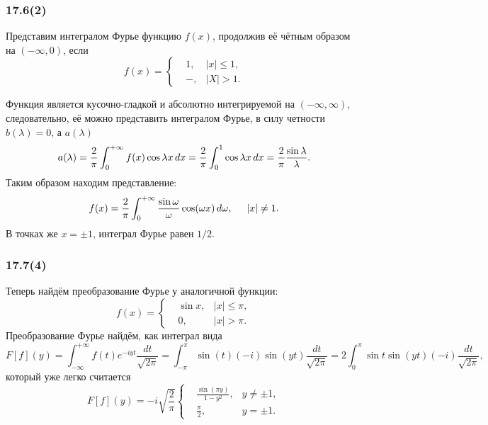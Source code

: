  \subsubsection*{17.6(2)}

 Представим интегралом Фурье функцию $f(x)$, продолжив её чётным образом на $(-\infty, 0)$, если 
 \begin{equation*}
     f(x) = \left\{\begin{aligned}
         &1, & |x|\leq 1, \\
         &-, &|X| > 1.
     \end{aligned}\right.
 \end{equation*}

 Функция является кусочно-гладкой и абсолютно интегрируемой на $(-\infty, \infty)$, следовательно, её можно представить интегралом Фурье, в силу четности $b(\lambda) = 0$, а $a(\lambda)$ 
 \begin{equation*}
     a(\lambda) = \frac{2}{\pi} \int_{0}^{+\infty} f(x) \cos \lambda x \, d x = 
     \frac{2}{\pi} \int_0^1 \cos \lambda x \, d x = \frac{2}{\pi} \frac{\sin \lambda}{\lambda}.
 \end{equation*}
 Таким образом находим представление:
 \begin{equation*}
     f(x) =\frac{2}{\pi} \int_{0}^{+\infty} \frac{\sin \omega}{\omega} \cos (\omega x) \, d \omega,
     \hspace{5 mm}
     |x| \neq 1.
 \end{equation*}
 В точках же $x = \pm 1$, интеграл Фурье равен $1/2$.


 \subsubsection*{17.7(4)}

 Теперь найдём преобразование Фурье у аналогичной функции:
 \begin{equation*}
     f(x) = \left\{\begin{aligned}
         &\sin x,  & |x| \leq \pi, \\
         &0, &|x| > \pi.
     \end{aligned}\right.
 \end{equation*}
Преобразование Фурье найдём, как интеграл вида
\begin{equation*}
    F[f](y) = \int_{-\infty}^{+\infty} f(t) e^{-i y t} \frac{d t}{\sqrt{2\pi}}  =
    \int_{-\pi}^{\pi} 
    \sin (t) (-i) \sin(y t)
    \frac{d t}{\sqrt{2\pi}}  = 
    2 \int_0^{\pi} \sin t \sin (y t) (-i) \frac{d t}{\sqrt{2\pi}} ,
\end{equation*}
который уже легко считается
\begin{equation*}
    F[f](y) = -i \sqrt{\frac{2}{\pi}} \left\{\begin{aligned}
        &\frac{\sin (\pi y)}{1-y^2},  &y \neq \pm 1, \\
        &\frac{\pi}{2}, & y = \pm 1.
    \end{aligned}\right.
\end{equation*}


